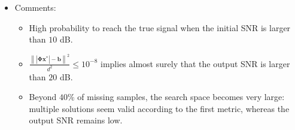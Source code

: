 \documentclass[25pt,a0paper]{tikzposter}
\newcommand{\vct}[1]{\bm{#1}} %
\newcommand{\mtx}[1]{\bm{#1}} %
\newcommand{\vbar}[1]{#1_{\overline{v}}} %
\def\xvbar{\vbar{x}} %
\def\C{\mathbb{C}} %
\begin{document}
\begin{columns}
{\begin{minipage}{.6\linewidth}
\begin{tikzpicture}
\end{tikzpicture}
\end{minipage}
\vspace{.5cm}
\begin{itemize}
    \item Comments:
    \begin{itemize}
        \item High probability to reach the true signal when the initial SNR is larger than $10$ dB.
        \item $\displaystyle \frac{\left\lVert |\mtx{\Phi} \vct{x}^{\ast} | - \vct{b} \right\rVert^2}{d^2} \leq 10^{-8}$ implies almost surely that the output SNR is larger than $20$ dB. 
        \item Beyond $40\%$ of missing samples, the search space becomes very large: multiple solutions seem valid according to the first metric, whereas the output SNR remains low.
    \end{itemize}
\end{itemize}

    
}
\end{columns}
\end{document}
